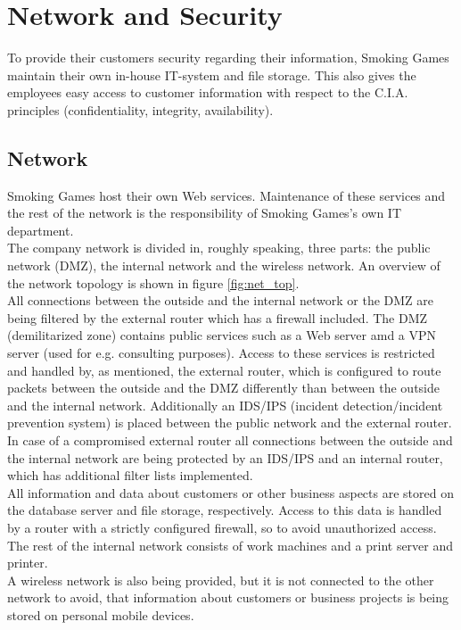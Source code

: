 \newpage
\section{Network and Security}
To provide their customers security regarding their information, Smoking Games maintain their own in-house IT-system and file storage. This also gives the employees easy access to customer information with respect to the C.I.A. principles (confidentiality, integrity, availability).
\subsection{Network}
Smoking Games host their own Web services. Maintenance of these services and the rest of the network is the responsibility of Smoking Games's own IT department.\\
The company network is divided in, roughly speaking, three parts: the public network (DMZ), the internal network and the wireless network. An overview of the network topology is shown in figure \ref{fig:net_top}.\\
All connections between the outside and the internal network or the DMZ are being filtered by the external router which has a firewall included. The DMZ (demilitarized zone) contains public services such as a Web server amd a VPN server (used for e.g. consulting purposes). Access to these services is restricted and handled by, as mentioned, the external router, which is configured to route packets between the outside and the DMZ differently than between the outside and the internal network. Additionally an IDS/IPS (incident detection/incident prevention system) is placed between the public network and the external router.\\
In case of a compromised external router all connections between the outside and the internal network are being protected by an IDS/IPS and an internal router, which has additional filter lists implemented.\\
All information and data about customers or other business aspects are stored on the database server and file storage, respectively. Access to this data is handled by a router with a strictly configured firewall, so to avoid unauthorized access.\\
The rest of the internal network consists of work machines and a print server and printer.\\
A wireless network is also being provided, but it is not connected to the other network to avoid, that information about customers or business projects is being stored on personal mobile devices.
